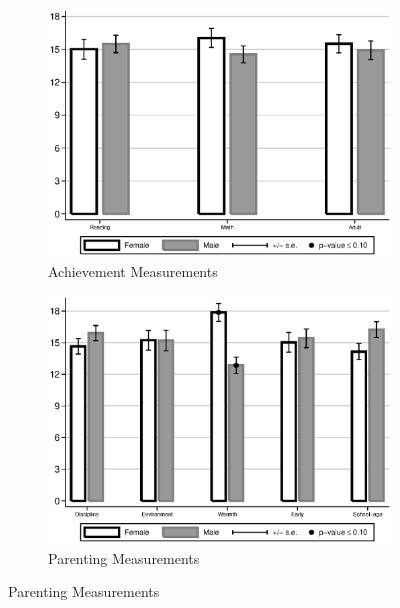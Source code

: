 \begin{figure}
\begin{center}
\begin{subfigure}[b]{0.49\textwidth}
	\caption{Achievement Measurements}
	\label{fig:intro-skills-plots-ach}
	\includegraphics[width=\textwidth]{../output/abccare-gdiff-ach}
\end{subfigure}
\begin{subfigure}[b]{0.49\textwidth}
	\caption{Parenting Measurements}
	\label{fig:intro-skills-plots-parenting}
	\includegraphics[width=\textwidth]{../output/abccare-gdiff-parenting}
\end{subfigure}
\end{center}
\raggedright \scriptsize

\end{figure}
